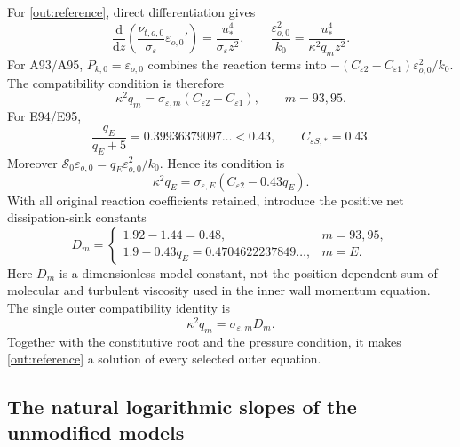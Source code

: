 \documentclass[11pt,a4paper]{article}
\numberwithin{equation}{section}
\newcommand{\eps}{\varepsilon}
\newcommand{\ust}{u_*}
\newcommand{\dd}{\mathrm d}
\begin{document}
For \cref{out:reference}, direct differentiation gives
\begin{equation}
 \frac{\dd}{\dd z}
  \left(\frac{\nu_{t,o,0}}{\sigma_\eps}\eps_{o,0}'\right)
 =\frac{\ust^4}{\sigma_\eps z^2},\qquad
 \frac{\eps_{o,0}^2}{k_0}
 =\frac{\ust^4}{\kappa^2q_mz^2}.
 \label{out:epsbalances}
\end{equation}
For A93/A95, $P_{k,0}=\eps_{o,0}$ combines the reaction terms into
$-(C_{\eps2}-C_{\eps1})\eps_{o,0}^2/k_0$. The compatibility condition
is therefore
\begin{equation}
 \kappa^2q_m=\sigma_{\eps,m}(C_{\eps2}-C_{\eps1}),
 \qquad m=93,95.
 \label{out:compatA}
\end{equation}
For E94/E95,
\begin{equation}
 \frac{q_E}{q_E+5}=0.39936379097\ldots<0.43,
 \qquad C_{\eps S,*}=0.43.
 \label{out:Ebranch}
\end{equation}
Moreover $\mathcal S_0\eps_{o,0}
=q_E\eps_{o,0}^2/k_0$. Hence its condition is
\begin{equation}
 \kappa^2q_E=\sigma_{\eps,E}(C_{\eps2}-0.43q_E).
 \label{out:compatE}
\end{equation}
With all original reaction coefficients retained, introduce the
positive net dissipation-sink constants
\begin{equation}
 D_m=\begin{cases}
 1.92-1.44=0.48,&m=93,95,\\
 1.9-0.43q_E=0.4704622237849\ldots,&m=E.
 \end{cases}
 \label{out:Dm}
\end{equation}
Here $D_m$ is a dimensionless model constant, not the position-dependent
sum of molecular and turbulent viscosity used in the inner wall
momentum equation. The single outer compatibility identity is
\begin{equation}
 \boxed{\kappa^2q_m=\sigma_{\eps,m}D_m.}
 \label{out:compat}
\end{equation}
Together with the constitutive root and the pressure condition, it
makes \cref{out:reference} a solution of every selected outer equation.

\subsection{The natural logarithmic slopes of the unmodified models}
\label{out:naturalkappa}
\end{document}
